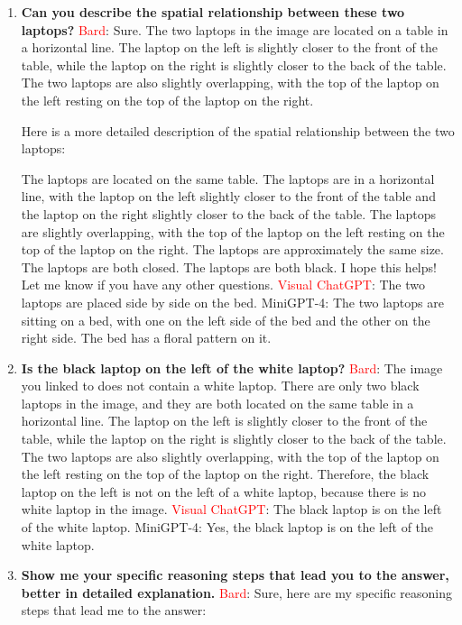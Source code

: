     \begin{enumerate}
        \item \textbf{Can you describe the spatial relationship between these two laptops?}
        \subitem \textcolor{Red}{Bard}:
        Sure. The two laptops in the image are located on a table in a horizontal line. The laptop on the left is slightly closer to the front of the table, while the laptop on the right is slightly closer to the back of the table. The two laptops are also slightly overlapping, with the top of the laptop on the left resting on the top of the laptop on the right.

        Here is a more detailed description of the spatial relationship between the two laptops:

        The laptops are located on the same table.
        The laptops are in a horizontal line, with the laptop on the left slightly closer to the front of the table and the laptop on the right slightly closer to the back of the table.
        The laptops are slightly overlapping, with the top of the laptop on the left resting on the top of the laptop on the right.
        The laptops are approximately the same size.
        The laptops are both closed.
        The laptops are both black.
        I hope this helps! Let me know if you have any other questions.
        \subitem \textcolor{red}{Visual ChatGPT}: The two laptops are placed side by side on the bed.
        \subitem MiniGPT-4: The two laptops are sitting on a bed, with one on the left side of the bed and the other on the right side. The bed has a floral pattern on it.

        \item \textbf{Is the black laptop on the left of the white laptop?}
        \subitem \textcolor{Red}{Bard}: The image you linked to does not contain a white laptop. There are only two black laptops in the image, and they are both located on the same table in a horizontal line. The laptop on the left is slightly closer to the front of the table, while the laptop on the right is slightly closer to the back of the table. The two laptops are also slightly overlapping, with the top of the laptop on the left resting on the top of the laptop on the right.
        Therefore, the black laptop on the left is not on the left of a white laptop, because there is no white laptop in the image.
        \subitem \textcolor{red}{Visual ChatGPT}: The black laptop is on the left of the white laptop.
        \subitem MiniGPT-4: Yes, the black laptop is on the left of the white laptop.
        \item \textbf{Show me your specific reasoning steps that lead you to the answer, better in detailed explanation.}
        \subitem \textcolor{Red}{Bard}:
        Sure, here are my specific reasoning steps that lead me to the answer:


\end{enumerate}

